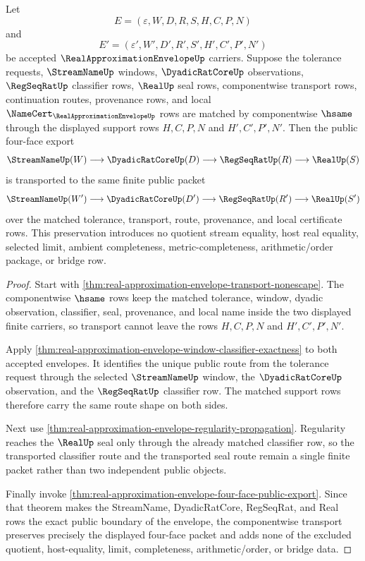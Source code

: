 \begin{theorem}
\label{thm:real-approximation-envelope-four-face-transport-stability}
Let
$$
E=(\varepsilon,W,D,R,S,H,C,P,N)
$$
and
$$
E'=(\varepsilon',W',D',R',S',H',C',P',N')
$$
be accepted $\RealApproximationEnvelopeUp$ carriers. Suppose the tolerance requests, $\StreamNameUp$ windows, $\DyadicRatCoreUp$ observations, $\RegSeqRatUp$ classifier rows, $\RealUp$ seal rows, componentwise transport rows, continuation routes, provenance rows, and local $\NameCert_{\RealApproximationEnvelopeUp}$ rows are matched by componentwise $\hsame$ through the displayed support rows $H,C,P,N$ and $H',C',P',N'$. Then the public four-face export
$$
\StreamNameUp(W) \longrightarrow \DyadicRatCoreUp(D) \longrightarrow \RegSeqRatUp(R) \longrightarrow \RealUp(S)
$$
is transported to the same finite public packet
$$
\StreamNameUp(W') \longrightarrow \DyadicRatCoreUp(D') \longrightarrow \RegSeqRatUp(R') \longrightarrow \RealUp(S')
$$
over the matched tolerance, transport, route, provenance, and local certificate rows. This preservation introduces no quotient stream equality, host real equality, selected limit, ambient completeness, metric-completeness, arithmetic/order package, or bridge row.
\end{theorem}
\begin{proof}
Start with \autoref{thm:real-approximation-envelope-transport-nonescape}. The componentwise $\hsame$ rows keep the matched tolerance, window, dyadic observation, classifier, seal, provenance, and local name inside the two displayed finite carriers, so transport cannot leave the rows $H,C,P,N$ and $H',C',P',N'$.

Apply \autoref{thm:real-approximation-envelope-window-classifier-exactness} to both accepted envelopes. It identifies the unique public route from the tolerance request through the selected $\StreamNameUp$ window, the $\DyadicRatCoreUp$ observation, and the $\RegSeqRatUp$ classifier row. The matched support rows therefore carry the same route shape on both sides.

Next use \autoref{thm:real-approximation-envelope-regularity-propagation}. Regularity reaches the $\RealUp$ seal only through the already matched classifier row, so the transported classifier route and the transported seal route remain a single finite packet rather than two independent public objects.

Finally invoke \autoref{thm:real-approximation-envelope-four-face-public-export}. Since that theorem makes the StreamName, DyadicRatCore, RegSeqRat, and Real rows the exact public boundary of the envelope, the componentwise transport preserves precisely the displayed four-face packet and adds none of the excluded quotient, host-equality, limit, completeness, arithmetic/order, or bridge data.
\end{proof}


